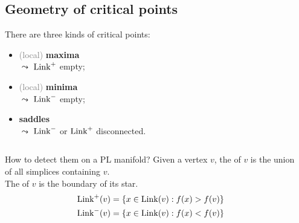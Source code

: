 \subsection{Geometry of critical points}
\begin{frame*}
There are three kinds of critical points:
\begin{itemize}
\item \textcolor{gray}{(local)} \textbf{maxima}\\
$\leadsto$ $\operatorname{Link}^+$ empty;
\item \textcolor{gray}{(local)} \textbf{minima}\\
$\leadsto$ $\operatorname{Link}^-$ empty;
\item \textbf{saddles}\\
$\leadsto$ $\operatorname{Link}^-$ or $\operatorname{Link}^+$ disconnected.
\end{itemize}
\begin{columns}[T,onlytextwidth]
\begin{column}{.65\textwidth}
\begin{block}{How to detect them on a PL manifold?}
Given a vertex $v$, the  of $v$ is the union of all simplices containing $v$.\\
The  of $v$ is the boundary of its star.
\begin{align*}
\operatorname{Link}^+(v)&=\left\{x\in\operatorname{Link}(v):f(x)>f(v)\right\}\\
\operatorname{Link}^-(v)&=\left\{x\in\operatorname{Link}(v):f(x)<f(v)\right\}\\
\end{align*}
\end{block}
\end{column}
\begin{column}{.35\textwidth}
\end{column}
\end{columns}
\end{frame*}

